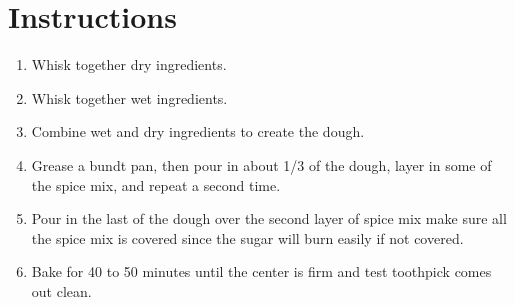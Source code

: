 \documentclass[ansiapaper,10pt,english]{sphinxmanual}
\begin{document}
\section{Instructions}
\label{\detokenize{spice_cake:instructions}}\begin{enumerate}
\item {} 
Whisk together dry ingredients.

\item {} 
Whisk together wet ingredients.

\item {} 
Combine wet and dry ingredients to create the dough.

\item {} 
Grease a bundt pan, then pour in about 1/3 of the dough, layer in some of the spice mix, and repeat a second time.

\item {} 
Pour in the last of the dough over the second layer of spice mix \textendash{} make sure all the spice mix is covered since the sugar will burn easily if not covered.

\item {} 
Bake for 40 to 50 minutes until the center is firm and test toothpick comes out clean.

\end{enumerate}



\renewcommand{\indexname}{Index}
\printindex
\end{document}
